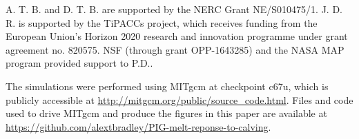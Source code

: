 \documentclass[draft]{agujournal2019}
\begin{document}
%
%

%

%




%
%
%
%
%
%
%
%


\acknowledgments
A. T. B. and D. T. B. are supported by the NERC Grant NE/S010475/1. J. D. R. is supported by the TiPACCs project, which receives funding from the European Union's Horizon 2020 research and innovation programme under grant agreement no. 820575. NSF (through grant OPP-1643285) and the NASA MAP program provided support to P.D..

The simulations were performed using MITgcm at checkpoint c67u, which is publicly accessible at \url{http://mitgcm.org/public/source_code.html}. Files and code used to drive MITgcm and produce the figures in this paper are available at \url{https://github.com/alextbradley/PIG-melt-reponse-to-calving}.
\end{document}
